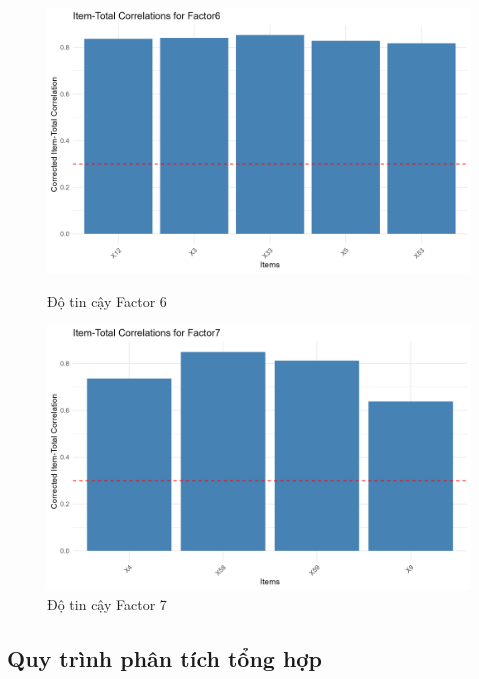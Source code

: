 \begin{figure}[h!]
    \centering
    \begin{minipage}{0.48\textwidth}
        \centering
        \includegraphics[width=\linewidth]{../../assets/images/reliability_Factor6.png}
        \caption{Độ tin cậy Factor 6}
        \label{fig:h7}
    \end{minipage}
    \hfill
    \begin{minipage}{0.48\textwidth}
        \centering
        \includegraphics[width=\linewidth]{../../assets/images/reliability_Factor7.png}
        \caption{Độ tin cậy Factor 7}
        \label{fig:h8}
    \end{minipage}
\end{figure}

\subsection{Quy trình phân tích tổng hợp}

